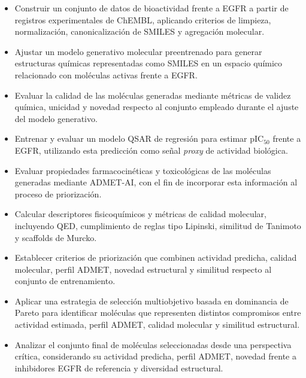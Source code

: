 \documentclass[IB]{TFUOC}%
\begin{document}
\begin{itemize}

    \item Construir un conjunto de datos de bioactividad frente a EGFR a partir de registros experimentales de ChEMBL, aplicando criterios de limpieza, normalización, canonicalización de SMILES y agregación molecular.

    \item Ajustar un modelo generativo molecular preentrenado para generar estructuras químicas representadas como SMILES en un espacio químico relacionado con moléculas activas frente a EGFR.

    \item Evaluar la calidad de las moléculas generadas mediante métricas de validez química, unicidad y novedad respecto al conjunto empleado durante el ajuste del modelo generativo.

    \item Entrenar y evaluar un modelo QSAR de regresión para estimar pIC$_{50}$ frente a EGFR, utilizando esta predicción como señal \textit{proxy} de actividad biológica.

    \item Evaluar propiedades farmacocinéticas y toxicológicas de las moléculas generadas mediante ADMET-AI, con el fin de incorporar esta información al proceso de priorización.

    \item Calcular descriptores fisicoquímicos y métricas de calidad molecular, incluyendo QED, cumplimiento de reglas tipo Lipinski, similitud de Tanimoto y scaffolds de Murcko.

    \item Establecer criterios de priorización que combinen actividad predicha, calidad molecular, perfil ADMET, novedad estructural y similitud respecto al conjunto de entrenamiento.

    \item Aplicar una estrategia de selección multiobjetivo basada en dominancia de Pareto para identificar moléculas que representen distintos compromisos entre actividad estimada, perfil ADMET, calidad molecular y similitud estructural.

    \item Analizar el conjunto final de moléculas seleccionadas desde una perspectiva crítica, considerando su actividad predicha, perfil ADMET, novedad frente a inhibidores EGFR de referencia y diversidad estructural.

\end{itemize}
\end{document}
